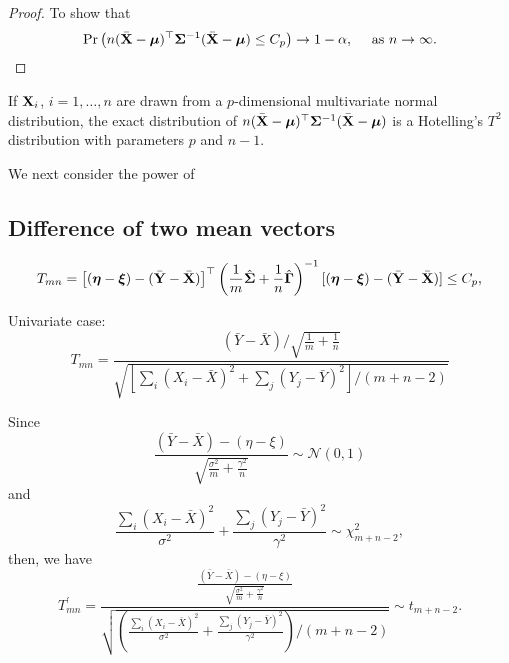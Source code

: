 \begin{proof}
	To show that
	\begin{equation*}
		\Pr\left(n(\bar{{\bf X}}-\boldsymbol{\mu})^{\top}\boldsymbol{\Sigma}^{-1}(\bar{{\bf X}}-\boldsymbol{\mu})\leq C_{p}\right)\rightarrow1-\alpha,\quad\text{ as }n\rightarrow\infty.
	\end{equation*}
\end{proof}

\begin{remark}
	If ${\bf X}_{i}$, $i=1,\ldots,n$ are drawn from a $p$-dimensional multivariate normal distribution, the exact distribution of $n(\bar{{\bf X}}-\boldsymbol{\mu})^{\top}\boldsymbol{\Sigma}^{-1}(\bar{{\bf X}}-\boldsymbol{\mu})$ is a Hotelling's $T^{2}$ distribution with parameters $p$ and $n-1$.
\end{remark}

We next consider the power of

\subsection{Difference of two mean vectors}

\begin{equation*}
	T_{mn}=\left[(\boldsymbol{\eta}-\boldsymbol{\xi})-(\bar{{\bf Y}}-\bar{{\bf X}})\right]^{\top}\left(\frac{1}{m}\hat{\boldsymbol{\Sigma}}+\frac{1}{n}\hat{\boldsymbol{\Gamma}}\right)^{-1}[(\boldsymbol{\eta}-\boldsymbol{\xi})-(\bar{{\bf Y}}-\bar{{\bf X}})]\leq C_{p},
\end{equation*}

Univariate case:
\begin{equation*}
	T_{mn}=\frac{(\bar{Y}-\bar{X})/\sqrt{\frac{1}{m}+\frac{1}{n}}}{\sqrt{\left[\sum_{i}\left(X_i-\bar{X}\right)^2+\sum_{j}\left(Y_j-\bar{Y}\right)^2\right]/(m+n-2)}}
\end{equation*}

Since
\begin{equation*}
	\frac{(\bar{Y}-\bar{X})-(\eta-\xi)}{\sqrt{\frac{\sigma^{2}}{m}+\frac{\gamma^{2}}{n}}}\sim\mathcal{N}(0,1)
\end{equation*}
and
\begin{equation*}
	\frac{\sum_{i}\left(X_i-\bar{X}\right)^2}{\sigma^{2}}+\frac{\sum_{j}\left(Y_j-\bar{Y}\right)^2}{\gamma^{2}}\sim\chi^{2}_{m+n-2},
\end{equation*}
then, we have
\begin{equation*}
	T_{mn}^{\prime}=\frac{\frac{(\bar{Y}-\bar{X})-(\eta-\xi)}{\sqrt{\frac{\sigma^{2}}{m}+\frac{\gamma^{2}}{n}}}}{\sqrt{\left(\frac{\sum_{i}\left(X_i-\bar{X}\right)^2}{\sigma^{2}}+\frac{\sum_{j}\left(Y_j-\bar{Y}\right)^2}{\gamma^{2}}\right)/(m+n-2)}}\sim t_{m+n-2}.
\end{equation*}

